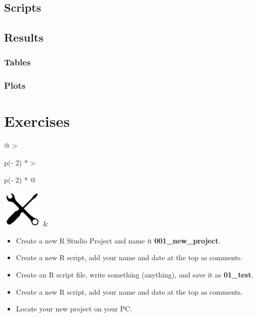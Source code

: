 \documentclass[
]{book}
\begin{document}
\hypertarget{scripts}{%
\subsection{Scripts}\label{scripts}}

\hypertarget{results}{%
\subsection{Results}\label{results}}

\hypertarget{tables}{%
\subsubsection{Tables}\label{tables}}

\hypertarget{plots}{%
\subsubsection{Plots}\label{plots}}

\hypertarget{exercises}{%
\section*{Exercises}\label{exercises}}

\begin{longtable}[]{@{}
  >{\raggedright\arraybackslash}p{(\columnwidth - 2\tabcolsep) * }
  >{\raggedright\arraybackslash}p{(\columnwidth - 2\tabcolsep) * }@{}}
\toprule\noalign{}
\endhead
\bottomrule\noalign{}
\endlastfoot
\includegraphics[width=\textwidth,height=0.70833in]{images/07.png} & \begin{minipage}[t]{\linewidth}\raggedright
\begin{itemize}
\item
  Create a new R Studio Project and name it \textbf{001\_new\_project}.
\item
  Create a new R script, add your name and date at the top as comments.
\item
  Create an R script file, write something (anything), and save it as \textbf{01\_test}.
\item
  Create a new R script, add your name and date at the top as comments.
\item
  Locate your new project on your PC.
\end{itemize}
\end{minipage} \\
\end{longtable}
\end{document}
